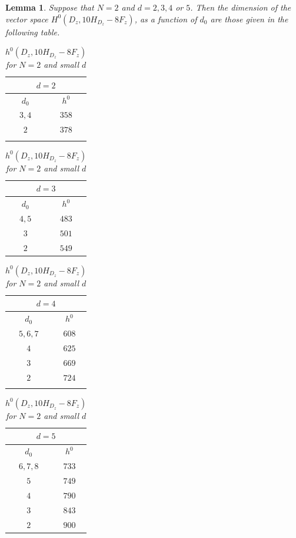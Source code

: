 \documentclass[a4paper,11pt]{amsart}
\newtheorem{lem}[thm]{Lemma}
\theoremstyle{definition}
\theoremstyle{remark}
\numberwithin{equation}{section}
\begin{document}
\begin{lem} \label{lem: dimension 10H N=2}
	Suppose that $N = 2$ and $d = 2, 3, 4$ or $5$. Then the dimension of the vector space $H^0(D_z,10H_{D_z}-8F_z)$, as a function of $d_0$ are those given in the following table. \begin{table}[ht]\caption{$h^0(D_z,10H_{D_z}-8F_z)$ for $N = 2$ and small $d$}\label{table: h^0(D_z,10H_{D_z}-8F_z}
		\begin{tabular}[t]{cc}
			\multicolumn{2}{c}{$d=2$} \\
			\hline
			$d_0$ & $h^0$ \\
			\hline
			$3,4$ &  $358$ \\
			$2$ &  $378$\\
			\phantom{$2$}
		\end{tabular}
		\quad\quad
		\begin{tabular}[t]{cc}
			\multicolumn{2}{c}{$d=3$} \\
			\hline
			$d_0$ & $h^0$ \\
			\hline
			$4,5$ & $483$ \\
			$3$ & $501$ \\
			$2$ & $549$ \\
		\end{tabular}
		\quad\quad
		\begin{tabular}[t]{cc}
			\multicolumn{2}{c}{$d=4$} \\
			\hline
			$d_0$ & $h^0$ \\
			\hline
			$5,6,7$ & $608$ \\
			$4$ & $625$ \\
			$3$ & $669$ \\
			$2$ & $724$ \\
			\phantom{$1$}
		\end{tabular}
		\quad\quad
		\begin{tabular}[t]{cc}
			\multicolumn{2}{c}{$d=5$} \\
			\hline
			$d_0$ & $h^0$ \\
			\hline
			$6,7,8$ & $733$ \\
			$5$ & $749$ \\
			$4$ & $790$ \\
			$3$ & $843$ \\
			$2$ & $900$
		\end{tabular}
	\end{table}
\end{lem}
\end{document}
